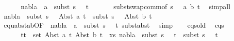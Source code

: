 \begin{isabellebody}
\ \ \ \ \ \ {\isachardoublequoteopen}nabla{}\ {\isasymturnstile}\ a\ {\isasymsharp}\ subst\ {\isacharparenleft}{\kern0pt}s{}\ {\isasymbullet}\ {\isacharbrackleft}{\kern0pt}{\isacharbrackright}{\kern0pt}{\isacharparenright}{\kern0pt}\ t{}{\isachardoublequoteclose}\ \isanewline
\ \ \ \ \isamarkupfalse%
\ subst{\isacharunderscore}{\kern0pt}swap{\isacharunderscore}{\kern0pt}comm{\isacharbrackleft}{\kern0pt}of\ {\isacartoucheopen}{\isacharparenleft}{\kern0pt}s{}\ {\isasymbullet}\ {\isacharbrackleft}{\kern0pt}{\isacharbrackright}{\kern0pt}{\isacharparenright}{\kern0pt}{\isacartoucheclose}\ {\isacartoucheopen}{\isacharbrackleft}{\kern0pt}{\isacharparenleft}{\kern0pt}a{\isacharcomma}{\kern0pt}\ b{\isacharparenright}{\kern0pt}{\isacharbrackright}{\kern0pt}{\isacartoucheclose}\ t{}{\isacharbrackright}{\kern0pt}\ \isamarkupfalse%
\ simp{\isacharunderscore}{\kern0pt}all\isanewline
\ \ \isamarkupfalse%
\ {\isachardoublequoteopen}nabla{}\ {\isasymturnstile}\ subst\ {\isacharparenleft}{\kern0pt}s{}\ {\isasymbullet}\ {\isacharbrackleft}{\kern0pt}{\isacharbrackright}{\kern0pt}{\isacharparenright}{\kern0pt}\ {\isacharparenleft}{\kern0pt}Abst\ a\ t{}{\isacharparenright}{\kern0pt}\ {\isasymapprox}\ subst\ {\isacharparenleft}{\kern0pt}s{}\ {\isasymbullet}\ {\isacharbrackleft}{\kern0pt}{\isacharbrackright}{\kern0pt}{\isacharparenright}{\kern0pt}\ {\isacharparenleft}{\kern0pt}Abst\ b\ t{}{\isacharparenright}{\kern0pt}{\isachardoublequoteclose}\isanewline
\ \ \ \ \isamarkupfalse%
\ equ{\isacharunderscore}{\kern0pt}abst{\isacharunderscore}{\kern0pt}ab{\isacharbrackleft}{\kern0pt}OF\ {}{\isacharparenleft}{\kern0pt}{}{\isacharparenright}{\kern0pt}\ {\isacartoucheopen}nabla{}\ {\isasymturnstile}\ a\ {\isasymsharp}\ subst\ {\isacharparenleft}{\kern0pt}s{}\ {\isasymbullet}\ {\isacharbrackleft}{\kern0pt}{\isacharbrackright}{\kern0pt}{\isacharparenright}{\kern0pt}\ t{}{\isacartoucheclose}{\isacharbrackright}{\kern0pt}\ subst{\isacharunderscore}{\kern0pt}abst\ \isamarkupfalse%
\ simp\isanewline
\ \ \isamarkupfalse%
\ eqs{\isacharunderscore}{\kern0pt}old\ \isamarkupfalse%
\ eqs{\isacharcolon}{\kern0pt}\isanewline
\ \ \ \ \ {\isachardoublequoteopen}{\isasymforall}\ {\isacharparenleft}{\kern0pt}t{}{\isacharcomma}{\kern0pt}t{}{\isacharparenright}{\kern0pt}\ {\isasymin}\ set\ {\isacharparenleft}{\kern0pt}{\isacharparenleft}{\kern0pt}Abst\ a\ t{}{\isacharcomma}{\kern0pt}\ Abst\ b\ t{}{\isacharparenright}{\kern0pt}\ {\isacharhash}{\kern0pt}\ xs{\isacharparenright}{\kern0pt}{\isachardot}{\kern0pt}\ nabla{}\ {\isasymturnstile}\ subst\ {\isacharparenleft}{\kern0pt}s{}\ {\isasymbullet}\ {\isacharbrackleft}{\kern0pt}{\isacharbrackright}{\kern0pt}{\isacharparenright}{\kern0pt}\ t{}\ {\isasymapprox}\ subst\ {\isacharparenleft}{\kern0pt}s{}\ {\isasymbullet}\ {\isacharbrackleft}{\kern0pt}{\isacharbrackright}{\kern0pt}{\isacharparenright}{\kern0pt}\ t{}{\isachardoublequoteclose}\isanewline

\end{isabellebody}
